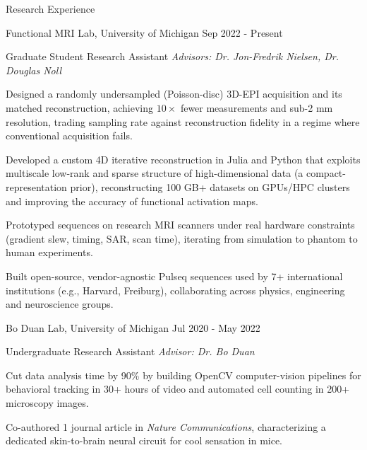 \documentclass{resume}
\begin{document}
\begin{rSection}{Research Experience}
    \begin{rSubsection}{Functional MRI Lab}{, University of Michigan \hfill {Sep 2022 - Present}}
    	\item {Graduate Student Research Assistant \hfill \textit{Advisors: Dr. Jon-Fredrik Nielsen, Dr. Douglas Noll}}
    	\begin{rSubsubsection}
            \item Designed a randomly undersampled (Poisson-disc) 3D-EPI acquisition and its matched reconstruction, achieving $10\times$ fewer measurements and sub-2 mm resolution, trading sampling rate against reconstruction fidelity in a regime where conventional acquisition fails.
            \item Developed a custom 4D iterative reconstruction in Julia and Python that exploits multiscale low-rank and sparse structure of high-dimensional data (a compact-representation prior), reconstructing 100 GB+ datasets on GPUs/HPC clusters and improving the accuracy of functional activation maps.
            \item Prototyped sequences on research MRI scanners under real hardware constraints (gradient slew, timing, SAR, scan time), iterating from simulation to phantom to human experiments.
            \item Built open-source, vendor-agnostic Pulseq sequences used by 7+ international institutions (e.g., Harvard, Freiburg), collaborating across physics, engineering and neuroscience groups.
    	\end{rSubsubsection}
	\end{rSubsection}

    \begin{rSubsection}{Bo Duan Lab}{, University of Michigan \hfill {Jul 2020 - May 2022}}
	\item {Undergraduate Research Assistant \hfill \textit{Advisor: Dr. Bo Duan}}
	\begin{rSubsubsection}
        \item Cut data analysis time by 90\% by building OpenCV computer-vision pipelines for behavioral tracking in 30+ hours of video and automated cell counting in 200+ microscopy images.
        \item Co-authored 1 journal article in \textit{Nature Communications}, characterizing a dedicated skin-to-brain neural circuit for cool sensation in mice.
	\end{rSubsubsection}
    \end{rSubsection}
\end{rSection}
\end{document}
